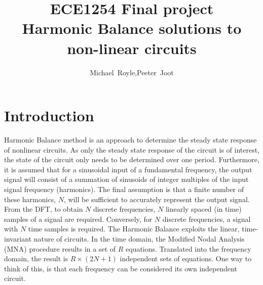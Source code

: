 \documentclass[12pt,journal,compsoc]{../ieeepaper/IEEEtran}
\begin{document}
\title{ECE1254 Final project \\ 
Harmonic Balance solutions to non-linear circuits
}

\author{Michael~Royle,Peeter~Joot}


\maketitle

\IEEEdisplaynontitleabstractindextext
\IEEEpeerreviewmaketitle

\section{Introduction}

Harmonic Balance method is an approach to determine the steady state response of nonlinear
circuits.
As only the steady state response of the circuit is of interest, the state of the circuit
only needs to be determined over one period.
Furthermore, it is assumed that for a sinusoidal input of a
fundamental frequency, the output signal will consist of a summation of sinusoids of integer multiples of
the input signal frequency (harmonics).
The final assumption is that a finite number of these harmonics,
\( N \), will be sufficient to accurately represent the output signal.
From the DFT, to obtain \( N \) discrete frequencies, \( N \) linearly spaced (in time) samples of a
signal are required.
Conversely, for \( N \) discrete frequencies, a signal with \( N \) time samples is required.
The Harmonic Balance exploits the linear, time-invariant nature of circuits.
In the time domain, the Modified Nodal Analysis (MNA) procedure results in a set of \( R \) equations.
Translated into the 
frequency domain, the result is \( R \times (2 N + 1) \) independent sets of equations.
One way to
think of this, is that each frequency can be considered its own independent circuit.
\end{document}
